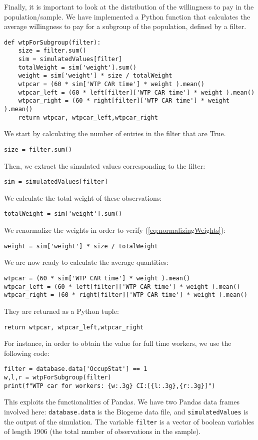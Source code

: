 \documentclass[12pt,a4paper]{article}
\newcommand{\req}[1]{(\ref{#1})}
\begin{document}
Finally, it is important to look at the distribution of the
willingness to pay in the population/sample. We have implemented a
Python function that calculates the average willingness to pay for a
subgroup of the population, defined by a filter.

\begin{lstlisting}
def wtpForSubgroup(filter):
    size = filter.sum()
    sim = simulatedValues[filter]
    totalWeight = sim['weight'].sum()
    weight = sim['weight'] * size / totalWeight
    wtpcar = (60 * sim['WTP CAR time'] * weight ).mean()
    wtpcar_left = (60 * left[filter]['WTP CAR time'] * weight ).mean()
    wtpcar_right = (60 * right[filter]['WTP CAR time'] * weight ).mean()
    return wtpcar, wtpcar_left,wtpcar_right
\end{lstlisting}

We start by calculating the number of entries in the filter that are
True. 
\begin{lstlisting}
size = filter.sum()
\end{lstlisting}
Then, we extract the simulated values corresponding to the filter:
\begin{lstlisting}
sim = simulatedValues[filter]
\end{lstlisting}
We calculate the total weight of these observations: 
\begin{lstlisting}
totalWeight = sim['weight'].sum()
\end{lstlisting}
We renormalize the weights in order to verify \req{eq:normalizingWeights}:
\begin{lstlisting}
weight = sim['weight'] * size / totalWeight
\end{lstlisting}
We are now ready to calculate the average quantities:
\begin{lstlisting}
wtpcar = (60 * sim['WTP CAR time'] * weight ).mean()
wtpcar_left = (60 * left[filter]['WTP CAR time'] * weight ).mean()
wtpcar_right = (60 * right[filter]['WTP CAR time'] * weight ).mean()
\end{lstlisting}
They are returned as a Python tuple:
\begin{lstlisting}
return wtpcar, wtpcar_left,wtpcar_right
\end{lstlisting}

For instance, in order to obtain the value for full time workers, we
use the following code:
\begin{lstlisting}
filter = database.data['OccupStat'] == 1
w,l,r = wtpForSubgroup(filter)
print(f"WTP car for workers: {w:.3g} CI:[{l:.3g},{r:.3g}]")
\end{lstlisting}
This exploits the functionalities of Pandas. We have two Pandas data
frames involved here: \lstinline+database.data+ is the Biogeme data
file, and \lstinline+simulatedValues+ is the output of the
simulation. The variable \lstinline+filter+ is a vector of boolean
variables of length 1906
(the total number of observations in the sample).
\end{document}
